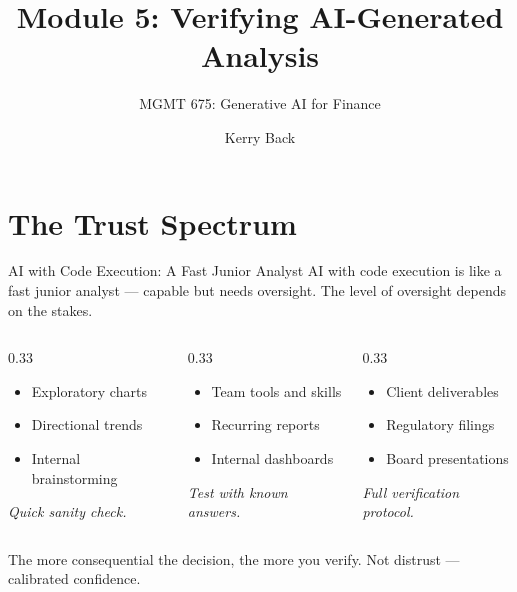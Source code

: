 \documentclass[aspectratio=169]{beamer}
\subtitle{MGMT 675: Generative AI for Finance}
\title{Module 5: Verifying AI-Generated Analysis}
\author{Kerry Back}
\date{}
\begin{document}
\maketitle

\section{The Trust Spectrum}

\begin{frame}[shrink=5]{AI with Code Execution: A Fast Junior Analyst}
AI with code execution is like a \alert{fast junior analyst} --- capable but needs oversight. The level of oversight depends on the stakes.
\vspace{0.3cm}
\begin{columns}[T]
\begin{column}{0.33\textwidth}
\begin{shadedbox}[title=\textbf{Low-Stakes}]
\begin{itemize}\small
  \item Exploratory charts
  \item Directional trends
  \item Internal brainstorming
\end{itemize}
\vspace{0.2cm}
\centering\small\textit{Quick sanity check.}
\end{shadedbox}
\end{column}
\begin{column}{0.33\textwidth}
\begin{shadedbox}[title=\textbf{Medium-Stakes}]
\begin{itemize}\small
  \item Team tools and skills
  \item Recurring reports
  \item Internal dashboards
\end{itemize}
\vspace{0.2cm}
\centering\small\textit{Test with known answers.}
\end{shadedbox}
\end{column}
\begin{column}{0.33\textwidth}
\begin{shadedbox}[title=\textbf{High-Stakes}]
\begin{itemize}\small
  \item Client deliverables
  \item Regulatory filings
  \item Board presentations
\end{itemize}
\vspace{0.2cm}
\centering\small\textit{Full verification protocol.}
\end{shadedbox}
\end{column}
\end{columns}
\vspace{0.3cm}
The more consequential the decision, the more you verify. \alert{Not distrust --- calibrated confidence.}
\end{frame}
\end{document}
